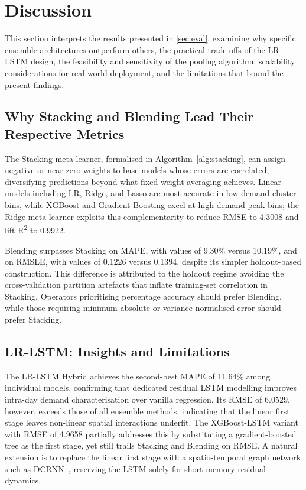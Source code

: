 \documentclass[a4paper,fleqn]{cas-dc}
\begin{document}
\section{Discussion}
\label{sec:discussion}

This section interprets the results presented in \autoref{sec:eval}, examining why specific ensemble architectures outperform others, the practical trade-offs of the LR-LSTM design, the feasibility and sensitivity of the pooling algorithm, scalability considerations for real-world deployment, and the limitations that bound the present findings.

\subsection{Why Stacking and Blending Lead Their Respective Metrics}

The Stacking meta-learner, formalised in Algorithm~\ref{alg:stacking}, can assign negative or near-zero weights to base models whose errors are correlated, diversifying predictions beyond what fixed-weight averaging achieves.  Linear models including LR, Ridge, and Lasso are most accurate in low-demand cluster-bins, while XGBoost and Gradient Boosting excel at high-demand peak bins; the Ridge meta-learner exploits this complementarity to reduce RMSE to 4.3008 and lift R\textsuperscript{2} to 0.9922.

Blending surpasses Stacking on MAPE, with values of 9.30\% versus 10.19\%, and on RMSLE, with values of 0.1226 versus 0.1394, despite its simpler holdout-based construction.  This difference is attributed to the holdout regime avoiding the cross-validation partition artefacts that inflate training-set correlation in Stacking.  Operators prioritising percentage accuracy should prefer Blending, while those requiring minimum absolute or variance-normalised error should prefer Stacking.

\subsection{LR-LSTM: Insights and Limitations}

The LR-LSTM Hybrid achieves the second-best MAPE of 11.64\% among individual models, confirming that dedicated residual LSTM modelling improves intra-day demand characterisation over vanilla regression.  Its RMSE of 6.0529, however, exceeds those of all ensemble methods, indicating that the linear first stage leaves non-linear spatial interactions underfit.  The XGBoost-LSTM variant with RMSE of 4.9658 partially addresses this by substituting a gradient-boosted tree as the first stage, yet still trails Stacking and Blending on RMSE.  A natural extension is to replace the linear first stage with a spatio-temporal graph network such as DCRNN~\cite{li2018diffusion}, reserving the LSTM solely for short-memory residual dynamics.
\end{document}
